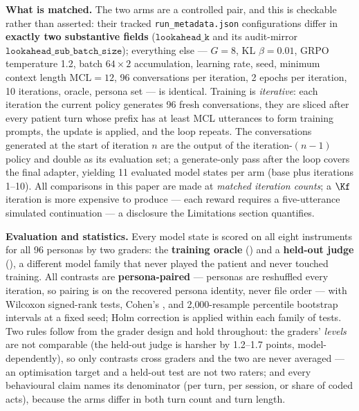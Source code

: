 \textbf{What is matched.} The two arms are a controlled pair, and this is checkable rather than
asserted: their tracked \texttt{run\_metadata.json} configurations differ in \textbf{exactly two
substantive fields} ($\texttt{lookahead\_k}$ and its audit-mirror
$\texttt{lookahead\_sub\_batch\_size}$); everything else --- $G{=}8$, KL $\beta{=}0.01$, GRPO
temperature 1.2, batch $64 \times 2$ accumulation, learning rate, seed, minimum context length
$\text{MCL}{=}12$, 96 conversations per iteration, 2 epochs per iteration, 10 iterations, oracle,
persona set --- is identical. Training is \emph{iterative}: each iteration the current policy
generates 96 fresh conversations, they are sliced after every patient turn whose prefix has at
least MCL utterances to form training prompts, the update is applied, and the loop repeats. The
conversations generated at the start of iteration $n$ are the output of the iteration-$(n{-}1)$
policy and double as its evaluation set; a generate-only pass after the loop covers the final
adapter, yielding 11 evaluated model states per arm (base plus iterations 1--10). All comparisons
in this paper are made at \emph{matched iteration counts}; a $\Kf$ iteration is more expensive to
produce --- each reward requires a five-utterance simulated continuation --- a disclosure the
Limitations section quantifies.

\textbf{Evaluation and statistics.} Every model state is scored on all eight instruments for all
96 personas by two graders: the \textbf{training oracle} (\primaryjudge) and a \textbf{held-out
judge} (\heldoutjudge), a different model family that never played the patient and never touched
training. All contrasts are \textbf{persona-paired} --- personas are reshuffled every iteration,
so pairing is on the recovered persona identity, never file order --- with Wilcoxon signed-rank
tests, Cohen's \dz, and 2{,}000-resample percentile bootstrap intervals at a fixed seed; Holm
correction is applied within each family of tests. Two rules follow from the grader design and hold
throughout: the graders' \emph{levels} are not comparable (the held-out judge is harsher by
1.2--1.7 points, model-dependently), so only contrasts cross graders and the two are never
averaged --- an optimisation target and a held-out test are not two raters; and every behavioural
claim names its denominator (per turn, per session, or share of coded acts), because the arms
differ in both turn count and turn length.
